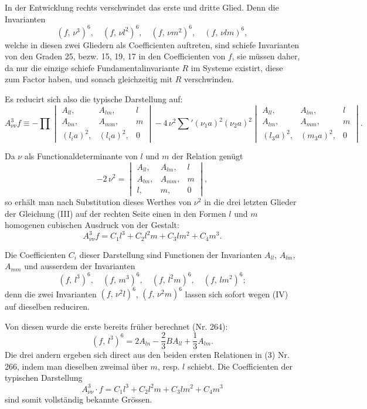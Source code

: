 \documentclass[11pt]{article}
\providecommand{\weberpage}[1]{}
\providecommand{\weq}[2]{\begin{equation}\tag{#1}#2\end{equation}}
\begin{document}
In der Entwicklung rechts verschwindet das erste und dritte Glied. Denn die Invarianten
\[
(f,\,\nu^3)^6,\quad (f,\,\nu l^2)^6,\quad (f,\,\nu m^2)^6,\quad (f,\,\nu lm)^6,
\]
welche in diesen zwei Gliedern als Coefficienten auftreten, sind schiefe Invarianten von den Graden 25, bezw. 15, 19, 17 in den Coefficienten von $f$, sie müssen daher, da nur die einzige schiefe Fundamentalinvariante $R$ im Systeme existirt, diese zum Factor haben, und sonach gleichzeitig mit $R$ verschwinden.

Es reducirt sich also die typische Darstellung auf:
\weq{III}{A_{\nu\nu}^3 f\equiv -\prod\begin{vmatrix}A_{ll}, & A_{lm}, & l\\ A_{lm}, & A_{mm}, & m\\ (l_ia)^2, & (l_ia)^2, & 0\end{vmatrix}%
-4\,\nu^2\sum{}'(\nu_1a)^2(\nu_2a)^2\begin{vmatrix}A_{ll}, & A_{lm}, & l\\ A_{lm}, & A_{mm}, & m\\ (l_3a)^2, & (m_3a)^2, & 0\end{vmatrix}.}

Da $\nu$ als Functionaldeterminante von $l$ und $m$ der Relation genügt
\weq{IV}{-2\,\nu^2=\begin{vmatrix}A_{ll}, & A_{lm}, & l\\ A_{lm}, & A_{mm}, & m\\ l, & m, & 0\end{vmatrix},}
so erhält man nach Substitution dieses Werthes von $\nu^2$ in die drei letzten Glieder der Gleichung (III) auf der rechten Seite einen in den Formen $l$ und $m$ homogenen cubischen Ausdruck von der Gestalt:
\[
A_{\nu\nu}^3 f=C_1l^3+C_2l^2m+C_3lm^2+C_4m^3.
\]


\weberpage{306}
Die Coefficienten $C_i$ dieser Darstellung sind Functionen der Invarianten $A_{ll}$, $A_{lm}$, $A_{mm}$ und ausserdem der Invarianten
\[
(f,\,l^3)^6,\quad (f,\,m^3)^6,\quad (f,\,l^2m)^6,\quad (f,\,lm^2)^6;
\]
denn die zwei Invarianten $(f,\,\nu^2l)^6$, $(f,\,\nu^2m)^6$ lassen sich sofort wegen (IV) auf dieselben reduciren.

Von diesen wurde die erste bereits früher berechnet (Nr. 264):
\[
(f,\,l^3)^6=2A_{ln}-\frac{2}{3}BA_{ll}+\frac{1}{3}A_{lm}.%
\]
Die drei andern ergeben sich direct aus den beiden ersten Relationen in (3) Nr. 266, indem man dieselben zweimal über $m$, resp. $l$ schiebt. Die Coefficienten der typischen Darstellung
\weq{V}{A_{\nu\nu}^3\cdot f=C_1l^3+C_2l^2m+C_3lm^2+C_4m^3}
sind somit vollständig bekannte Grössen.
\end{document}
